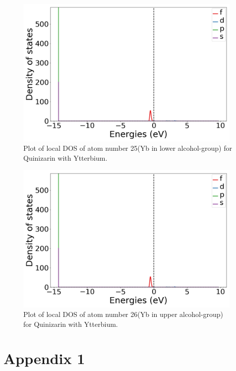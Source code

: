 \documentclass{article}
\begin{document}
  \begin{figure}[H]
      \centering
      \includegraphics[width = 11cm]{../fig/Yb_LDOS25_1.png}
      \caption{Plot of local DOS of atom number 25(Yb in lower alcohol-group) for Quinizarin with Ytterbium. }
      \label{fig:Yb_LDOS25_1.png}
  \end{figure}

  \begin{figure}[H]
      \centering
      \includegraphics[width = 11cm]{../fig/Yb_LDOS26_1.png}
      \caption{Plot of local DOS of atom number 26(Yb in upper alcohol-group) for Quinizarin with Ytterbium. }
      \label{fig:Yb_LDOS26_1.png}
  \end{figure}

\fi

\vspace{1cm}

\section{Appendix 1}
\end{document}
